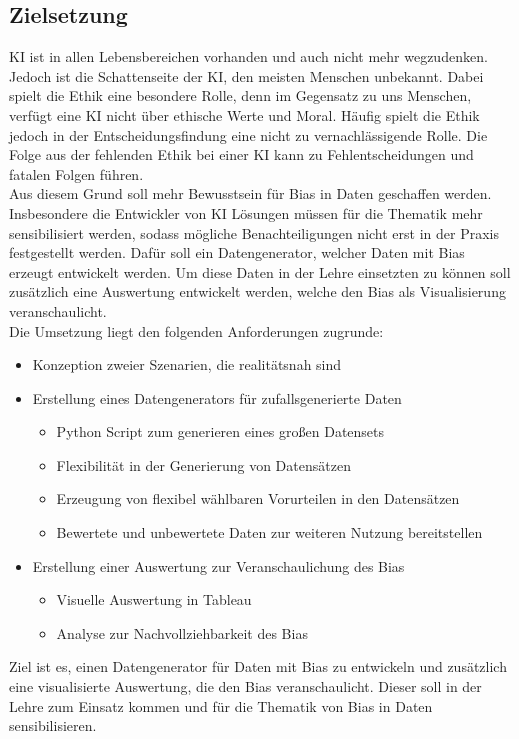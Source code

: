 \begin{onehalfspace}
    \newpage
    \section{Zielsetzung}
    \label{subsec:zielsetzung}
    \ac*{KI} ist in allen Lebensbereichen vorhanden und auch nicht mehr wegzudenken. Jedoch ist die Schattenseite der \ac*{KI}, den meisten Menschen unbekannt. Dabei spielt die Ethik eine besondere Rolle, denn im Gegensatz zu uns Menschen, verfügt eine \ac*{KI} nicht über ethische Werte und Moral. Häufig spielt die Ethik jedoch in der Entscheidungsfindung eine nicht zu vernachlässigende Rolle. Die Folge aus der fehlenden Ethik bei einer \ac*{KI} kann zu Fehlentscheidungen und fatalen Folgen führen.
    \\
    Aus diesem Grund soll mehr Bewusstsein für Bias in Daten geschaffen werden. Insbesondere die Entwickler von \ac*{KI} Lösungen müssen für die Thematik mehr sensibilisiert werden, sodass mögliche Benachteiligungen nicht erst in der Praxis festgestellt werden. Dafür soll ein Datengenerator, welcher Daten mit Bias erzeugt entwickelt werden. Um diese Daten in der Lehre einsetzten zu können soll zusätzlich eine Auswertung entwickelt werden, welche den Bias als Visualisierung veranschaulicht. 
    \\
    Die Umsetzung liegt den folgenden Anforderungen zugrunde:
    \begin{itemize}
        \item Konzeption zweier Szenarien, die realitätsnah sind
        \item Erstellung eines Datengenerators für zufallsgenerierte Daten
        \begin{itemize}
            \item Python Script zum generieren eines großen Datensets
            \item Flexibilität in der Generierung von Datensätzen
            \item Erzeugung von flexibel wählbaren Vorurteilen in den Datensätzen
            \item Bewertete und unbewertete Daten zur weiteren Nutzung bereitstellen
        \end{itemize}
        \item Erstellung einer Auswertung zur Veranschaulichung des Bias
        \begin{itemize}
            \item Visuelle Auswertung in Tableau
            \item Analyse zur Nachvollziehbarkeit des Bias
        \end{itemize}
    \end{itemize} 
    Ziel ist es, einen Datengenerator für Daten mit Bias zu entwickeln und zusätzlich eine visualisierte Auswertung, die den Bias veranschaulicht. Dieser soll in der Lehre zum Einsatz kommen und für die Thematik von Bias in Daten sensibilisieren.


\end{onehalfspace}
